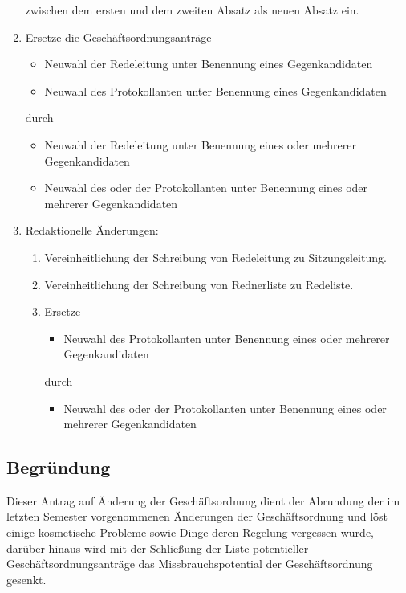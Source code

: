 \documentclass[draft,12pt,oneside]{scrartcl}
\begin{document}
\begin{enumerate}
\begin{quote}
		\end{quote}
		zwischen dem ersten und dem zweiten Absatz als neuen Absatz ein.
	\item Ersetze die Geschäftsordnungsanträge
		\begin{itemize}
			\item Neuwahl der Redeleitung unter Benennung eines Gegenkandidaten
			\item Neuwahl des Protokollanten unter Benennung eines Gegenkandidaten
		\end{itemize}
		durch
		\begin{itemize}
			\item Neuwahl der Redeleitung unter Benennung eines oder mehrerer Gegenkandidaten
			\item Neuwahl des oder der Protokollanten unter Benennung eines oder mehrerer Gegenkandidaten
		\end{itemize}
	\item Redaktionelle Änderungen:
		\begin{enumerate}
			\item Vereinheitlichung der Schreibung von Redeleitung zu Sitzungsleitung.
			\item Vereinheitlichung der Schreibung von Rednerliste zu Redeliste.
			\item Ersetze
				\begin{itemize}
					\item Neuwahl des Protokollanten unter Benennung eines oder mehrerer Gegenkandidaten
				\end{itemize}
				durch
				\begin{itemize}
					\item Neuwahl des oder der Protokollanten unter Benennung eines oder mehrerer Gegenkandidaten
				\end{itemize}
		\end{enumerate}
\end{enumerate}

\subsection*{Begründung}

Dieser Antrag auf Änderung der Geschäftsordnung dient der Abrundung der im
letzten Semester vorgenommenen Änderungen der Geschäftsordnung und löst einige
kosmetische Probleme sowie Dinge deren Regelung vergessen wurde, darüber hinaus
wird mit der Schließung der Liste potentieller Geschäftsordnungsanträge das
Missbrauchspotential der Geschäftsordnung gesenkt.
\end{document}
